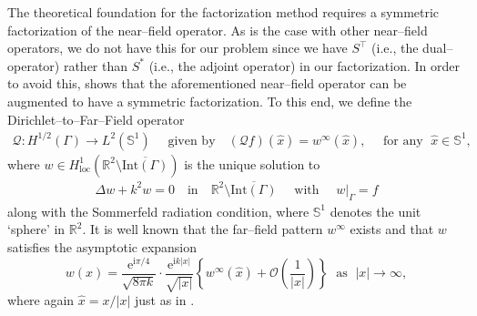\documentclass{article}
\newcommand{\R}{\mathbb{R}}
\numberwithin{equation}{section}
\begin{document}
The theoretical foundation for the factorization method requires a symmetric factorization of the near--field operator. As is the case with other near--field operators, we do not have this for our problem since we have $S^\top$ (i.e., the dual--operator) rather than $S^*$ (i.e., the adjoint operator) in our factorization. In order to avoid this, \cite{nf-fft-dsm} shows that the aforementioned near--field operator can be augmented to have a symmetric factorization. To this end, we define the Dirichlet--to--Far--Field operator   
\begin{align}
\mathcal{Q}: H^{1/2}(\Gamma) \longrightarrow L^2(\mathbb{S}^{1})  \quad  \text{ given by} \quad (\mathcal{Q} f)(\hat{x}) = w^{\infty}(\hat{x}), \quad \text{ for any } \; \hat{x} \in \mathbb{S}^{1}, \label{Q-operator}
\end{align}
where $w\in H^1_{\text{loc}}(\R^2 \setminus \overline{\text{Int}(\Gamma)})$ is the unique solution to
\begin{align}
\Delta w +k^2 w  =  0 \quad \text{in}  \quad \R^2 \setminus \overline{\text{Int}(\Gamma)} \quad \text{ with } \quad w|_\Gamma = f \label{eq-ext1}
\end{align} 
along with the Sommerfeld radiation condition, where $\mathbb{S}^{1}$ denotes the unit `sphere' in $\R^2$. It is well known that the far--field pattern $w^{\infty}$ exists and that $w$ satisfies the asymptotic expansion 
$$w(x)= \frac{ \mathrm{e}^{\mathrm{i}\pi/4} }{ \sqrt{8 \pi k} }  \cdot  \frac{\text{e}^{\text{i}k|x|}}{\sqrt{ |x| } } \left\{w^{\infty}(\hat{x}) + \mathcal{O} \left( \frac{1}{|x|}\right) \right\}\; \textrm{  as  } \;  |x| \to \infty,$$
where again $\hat x=x/|x|$ just as in \cite{nf-fft-dsm}. 
\end{document}
